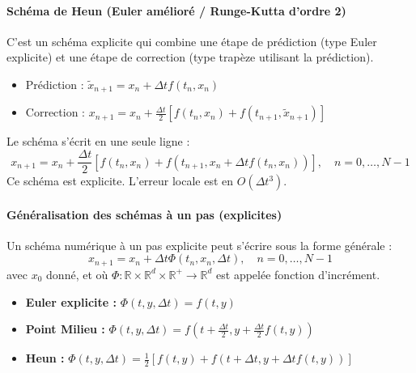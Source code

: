 \documentclass{article}
\begin{document}
\paragraph{Schéma de Heun (Euler amélioré / Runge-Kutta d'ordre 2)}
C'est un schéma explicite qui combine une étape de prédiction (type Euler explicite) et une étape de correction (type trapèze utilisant la prédiction).
\begin{itemize}
    \item Prédiction : $\tilde{x}_{n+1} = x_n + \Delta t f(t_n, x_n)$
    \item Correction : $x_{n+1} = x_n + \frac{\Delta t}{2} [f(t_n, x_n) + f(t_{n+1}, \tilde{x}_{n+1})]$
\end{itemize}
Le schéma s'écrit en une seule ligne :
\[ x_{n+1} = x_n + \frac{\Delta t}{2} [f(t_n, x_n) + f(t_{n+1}, x_n + \Delta t f(t_n, x_n))], \quad n=0, \dots, N-1 \]
Ce schéma est explicite. L'erreur locale est en $O(\Delta t^3)$.

\paragraph{Généralisation des schémas à un pas (explicites)}
Un schéma numérique à un pas explicite peut s'écrire sous la forme générale :
\[ x_{n+1} = x_n + \Delta t \Phi(t_n, x_n, \Delta t), \quad n=0, \dots, N-1 \]
avec $x_0$ donné, et où $\Phi: \mathbb{R} \times \mathbb{R}^d \times \mathbb{R}^+ \to \mathbb{R}^d$ est appelée fonction d'incrément.

\begin{itemize}
    \item \textbf{Euler explicite :} $\Phi(t, y, \Delta t) = f(t, y)$
    \item \textbf{Point Milieu :} $\Phi(t, y, \Delta t) = f(t + \frac{\Delta t}{2}, y + \frac{\Delta t}{2} f(t, y))$
    \item \textbf{Heun :} $\Phi(t, y, \Delta t) = \frac{1}{2} [f(t, y) + f(t + \Delta t, y + \Delta t f(t, y))]$
\end{itemize}
\end{document}
